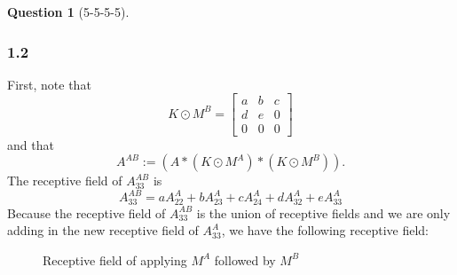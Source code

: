 \documentclass[12pt]{article}
\theoremstyle{definition}
\newtheorem{exercise}{Question}%
\begin{document}
\begin{exercise}[5-5-5-5]
{  \subsubsection*{1.2}
  First, note that
  \begin{equation}
    K \odot M^{B} =
        \begin{bmatrix}
            a & b & c \\
            d & e & 0 \\
            0 & 0 & 0
        \end{bmatrix}
        \label{kma}
    \end{equation}
    and that
    \begin{equation}
      A^{AB} := (A * (K \odot M^{A}) * (K \odot M^{B})).
      \label{aab}
    \end{equation}
    The receptive field of $A_{33}^{AB}$ is
    \begin{equation}
      A^{AB}_{33} = aA^{A}_{22} +  b A^{A}_{23} + c   A^{A}_{24} + d A^{A}_{32} + e A^{A}_{33}
    \label{eqab}
    \end{equation}
    Because the receptive field of $A^{AB}_{33}$ is the union of receptive fields
    and we are only adding in the new receptive field of $A^{A}_{33}$, we have the
    following receptive field:
    \begin{figure}[h]
    \centering
    \caption{Receptive field of applying $M^{A}$ followed by $M^{B}$}
    \label{fig:pixcnn5}
    \end{figure}

}
\end{exercise}
\end{document}
